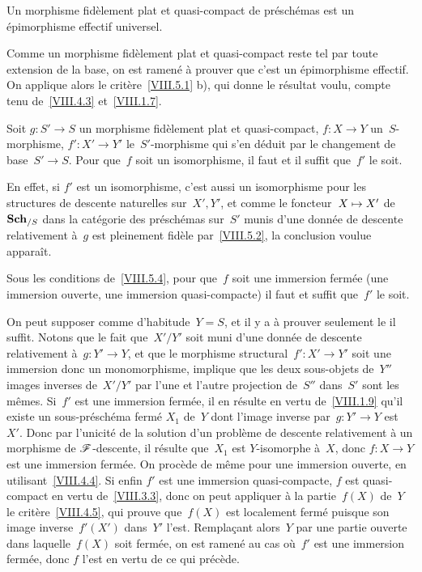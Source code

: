 \begin{corollaire}
\label{VIII.5.3}
Un morphisme fid\`element plat et quasi-compact de
pr\'esch\'emas est un \'epi\-mor\-phisme effectif universel.
\end{corollaire}

Comme un morphisme fid\`element plat et quasi-compact reste tel par
toute extension de la base, on est ramen\'e \`a prouver que c'est
un \'epimorphisme effectif. On applique alors le
crit\`ere~\ref{VIII.5.1} b), qui donne le r\'esultat voulu, compte
tenu de~\ref{VIII.4.3} et~\ref{VIII.1.7}.

\begin{corollaire}
\label{VIII.5.4}
Soit $g\colon S'\to S$ un morphisme fid\`element plat et
quasi-compact, $f\colon X\to Y$ un~$S$-morphisme, $f'\colon X'\to Y'$
le~$S'$-morphisme qui s'en d\'eduit par le changement de base~$S'\to
S$. Pour que~$f$ soit un isomorphisme, il faut et il suffit que~$f'$
le soit.
\end{corollaire}

En effet, si $f'$ est un isomorphisme, c'est aussi un isomorphisme
pour les structures de descente naturelles sur~$X',Y'$, et comme le
foncteur~$X\mto X'$ de~$\mathbf{Sch}_{/S}$ dans la cat\'egorie des
pr\'esch\'emas sur~$S'$ munis d'une donn\'ee de descente
relativement \`a~$g$ est pleinement fid\`ele par~\ref{VIII.5.2},
la conclusion voulue appara\^it.

\begin{corollaire}
\label{VIII.5.5}
Sous les conditions de~\ref{VIII.5.4}, pour que~$f$ soit une immersion
ferm\'ee (\resp une immersion ouverte, \resp une immersion
quasi-compacte) il faut et suffit que~$f'$ le soit.
\end{corollaire}

On peut supposer comme d'habitude~$Y=S$, et il y a \`a prouver
seulement le \og il suffit\fg. Notons que le fait que~$X'/Y'$ soit muni
d'une donn\'ee de descente relativement \`a~$g\colon Y'\to Y$, et
que le morphisme structural~$f'\colon X'\to Y'$ soit une immersion
donc un monomorphisme, implique que les deux sous-objets de~$Y''$
images
inverses de~$X'/Y'$ par l'une et l'autre projection de~$S''$ dans~$S'$
sont les m\^emes. Si~$f'$ est une immersion ferm\'ee, il en
r\'esulte en vertu de~\ref{VIII.1.9} qu'il existe un
sous-pr\'esch\'ema ferm\'e $X_{1}$ de~$Y$ dont l'image inverse
par~$g\colon Y'\to Y$ est~$X'$. Donc par l'unicit\'e de la solution
d'un probl\`eme de descente relativement \`a un morphisme de
$\cal{F}$-descente,
il
r\'esulte que~$X_{1}$ est $Y$-isomorphe \`a~$X$, donc $f\colon
X\to Y$ est une immersion ferm\'ee. On proc\`ede de m\^eme pour
une immersion ouverte, en utilisant~\ref{VIII.4.4}. Si enfin $f'$ est
une immersion quasi-compacte, $f$ est quasi-compact en vertu
de~\ref{VIII.3.3}, donc on peut appliquer \`a la partie~$f(X)$
de~$Y$ le crit\`ere~\ref{VIII.4.5}, qui prouve que~$f(X)$ est
localement ferm\'e puisque son image inverse~$f'(X')$ dans~$Y'$
l'est. Rempla\c cant alors~$Y$ par une partie ouverte dans
laquelle~$f(X)$ soit ferm\'ee, on est ramen\'e au cas o\`u~$f'$
est une immersion ferm\'ee, donc $f$ l'est en vertu de ce qui
pr\'ec\`ede.

